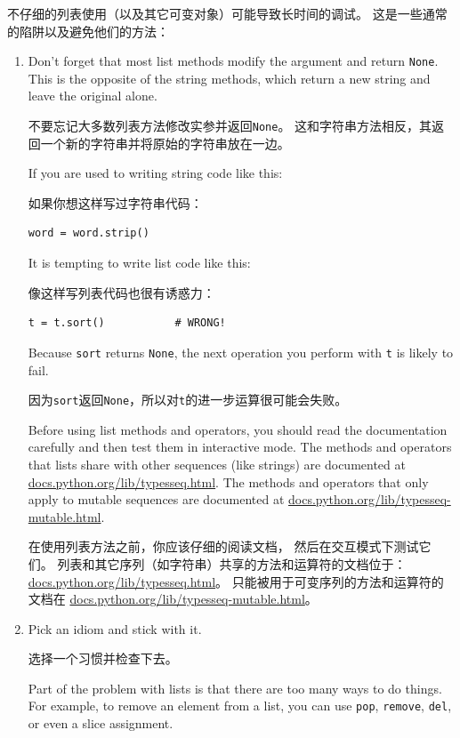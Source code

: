 \documentclass[10pt]{book}
\begin{document}
\begin{CJK}{UTF8}{gbsn}
不仔细的列表使用（以及其它可变对象）可能导致长时间的调试。
这是一些通常的陷阱以及避免他们的方法：

\begin{enumerate}

\item Don't forget that most list methods modify the argument and
  return {\tt None}.  This is the opposite of the string methods,
  which return a new string and leave the original alone.
  
  不要忘记大多数列表方法修改实参并返回{\tt None}。
  这和字符串方法相反，其返回一个新的字符串并将原始的字符串放在一边。

If you are used to writing string code like this:

如果你想这样写过字符串代码：

\begin{verbatim}
word = word.strip()
\end{verbatim}

It is tempting to write list code like this:

像这样写列表代码也很有诱惑力：

\begin{verbatim}
t = t.sort()           # WRONG!
\end{verbatim}

Because {\tt sort} returns {\tt None}, the
next operation you perform with {\tt t} is likely to fail.

因为{\tt sort}返回{\tt None}，所以对{\tt t}的进一步运算很可能会失败。

Before using list methods and operators, you should read the
documentation carefully and then test them in interactive mode.  The
methods and operators that lists share with other sequences (like
strings) are documented at
\url{docs.python.org/lib/typesseq.html}.  The
methods and operators that only apply to mutable sequences
are documented at \url{docs.python.org/lib/typesseq-mutable.html}.

在使用列表方法之前，你应该仔细的阅读文档，
然后在交互模式下测试它们。
列表和其它序列（如字符串）共享的方法和运算符的文档位于：
\url{docs.python.org/lib/typesseq.html}。
只能被用于可变序列的方法和运算符的文档在
\url{docs.python.org/lib/typesseq-mutable.html}。


\item Pick an idiom and stick with it.

选择一个习惯并检查下去。

Part of the problem with lists is that there are too many
ways to do things.  For example, to remove an element from
a list, you can use {\tt pop}, {\tt remove}, {\tt del},
or even a slice assignment.


\end{enumerate}
\end{CJK}
\end{document}
